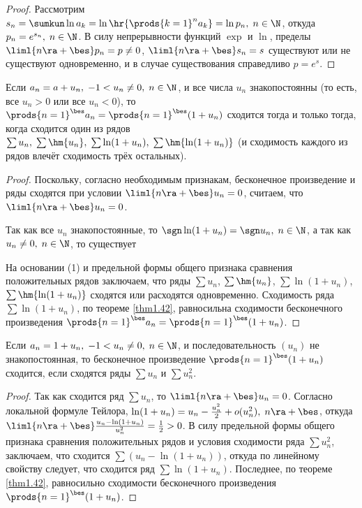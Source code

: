 \documentclass[a4paper]{article}
\begin{document}
\begin{proof}
Рассмотрим $s_n=\sumkun \ln a_k = \ln \hr{\prods{k=1}^n a_k}=\ln
p_n, \; n\in\N$, откуда $p_n=e^{s_n}, \; n\in\N$. В силу
непрерывности функций $\exp$ и $\ln$, пределы
$\liml{n\ra+\bes}p_n=p\ne0$, $\liml{n\ra+\bes}s_n=s$ существуют или
не существуют одновременно, и в случае существования справедливо
$p=e^s$.
\end{proof}

\begin{theorem}\label{thm1.43}
Если $a_n=a+u_n, \; -1<u_n\ne0, \; n\in\N$, и все числа $u_n$
знакопостоянны (то есть, все $u_n>0$ или все $u_n<0$), то
$\prods{n=1}^{\bes} a_n = \prods{n=1}^{\bes} (1+u_n)$ сходится тогда
и только тогда, когда сходится один из рядов $\sum u_n, \;
\sum\hm{u_n}, \; \sum\ln(1+u_n), \; \sum\hm{\ln(1+u_n)}$ (и
сходимость каждого из рядов влечёт сходимость трёх остальных).
\end{theorem}

\begin{proof}
Поскольку, согласно необходимым признакам, бесконечное произведение
и ряды сходятся при условии $\liml{n\ra+\bes}u_n=0$, считаем, что
$\liml{n\ra+\bes}u_n=0$.

Так как все $u_n$ знакопостоянные, то $\sgn \ln(1+u_n)=\sgn u_n, \;
n\in\N$, а так как $u_n\ne0, \; n\in\N$, то существует

На основании (1) и предельной формы общего признака сравнения
положительных рядов заключаем, что ряды $\sum u_n$, $\sum\hm{u_n}$,
$\sum\ln(1+u_n)$, $\sum\hm{\ln(1+u_n)}$ сходятся или расходятся
одновременно. Сходимость ряда $\sum\ln(1+u_n)$, по теореме
\ref{thm1.42}, равносильна сходимости бесконечного произведения
$\prods{n=1}^{\bes} a_n=\prods{n=1}^{\bes} (1+u_n)$.
\end{proof}

\begin{theorem}
Если $a_n = 1+u_n, \; -1<u_n\ne0, \; n\in\N$, и последовательность
$(u_n)$ не знакопостоянная, то бесконечное произведение
$\prods{n=1}^{\bes}(1+u_n)$ сходится, если сходятся ряды $\sum u_n$
и $\sum u_n^2$.
\end{theorem}

\begin{proof}
Так как сходится ряд $\sum u_n$, то $\liml{n\ra+\bes}u_n=0$.
Согласно локальной формуле Тейлора, $\ln(1+u_n)= u_n - \frac{u_n^2}2
+ o(u_n^2), \; n\ra+\bes$, откуда $\liml{n\ra+\bes}\frac{u_n -
\ln(1+u_n)}{u_n^2}=\frac12>0$. В силу предельной формы общего
признака сравнения положительных рядов и условия сходимости ряда
$\sum u_n^2$, заключаем, что сходится $\sum (u_n - \ln(1+u_n))$,
откуда по линейному свойству следует, что сходится ряд $\sum
\ln(1+u_n)$. Последнее, по теореме \ref{thm1.42}, равносильно
сходимости бесконечного произведения $\prods{n=1}^{\bes}(1+u_n)$.
\end{proof}
\end{document}
